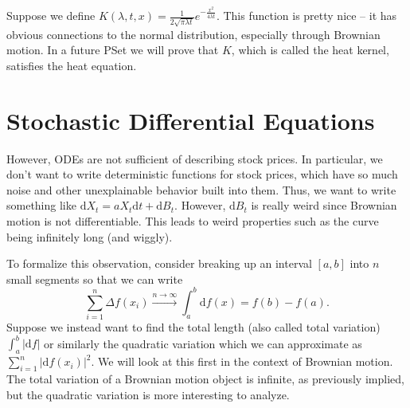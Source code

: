 Suppose we define $K(\lambda,t,x) = \frac{1}{2\sqrt{\pi\lambda t}} e^{-\frac{x^2}{4\lambda t}}$. This function is pretty nice -- it has obvious connections to the normal distribution, especially through Brownian motion. In a future PSet we will prove that $K$, which is called the heat kernel, satisfies the heat equation.

\section{Stochastic Differential Equations}
However, ODEs are not sufficient of describing stock prices. In particular, we don't want to write deterministic functions for stock prices, which have so much noise and other unexplainable behavior built into them. Thus, we want to write something like $\mathrm dX_t = aX_t\mathrm dt + \mathrm dB_t.$ However, $\mathrm dB_t$ is really weird since Brownian motion is not differentiable. This leads to weird properties such as the curve being infinitely long (and wiggly).

To formalize this observation, consider breaking up an interval $[a,b]$ into $n$ small segments so that we can write $$ \sum_{i=1}^n \Delta f(x_i) \overset{n\to\infty}{\longrightarrow} \int_a^b \mathrm df(x) = f(b) - f(a). $$ Suppose we instead want to find the total length (also called total variation) $\int_a^b |\mathrm df|$ or similarly the quadratic variation which we can approximate as $\sum_{i=1}^n \left\lvert\mathrm df(x_i)\right\rvert^2$. We will look at this first in the context of Brownian motion. The total variation of a Brownian motion object is infinite, as previously implied, but the quadratic variation is more interesting to analyze.

